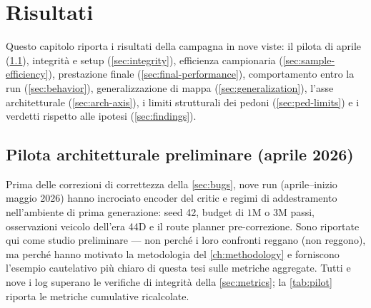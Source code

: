 \chapter{Risultati}
\label{ch:results}

Questo capitolo riporta i risultati della campagna in nove viste: il
pilota di aprile (\cref{sec:pilot}), integrità e setup
(\cref{sec:integrity}), efficienza campionaria
(\cref{sec:sample-efficiency}), prestazione finale
(\cref{sec:final-performance}), comportamento entro la run
(\cref{sec:behavior}), generalizzazione di mappa
(\cref{sec:generalization}), l'asse architetturale
(\cref{sec:arch-axis}), i limiti strutturali dei pedoni
(\cref{sec:ped-limits}) e i verdetti rispetto alle ipotesi
(\cref{sec:findings}).

\section{Pilota architetturale preliminare (aprile 2026)}
\label{sec:pilot}

Prima delle correzioni di correttezza della \cref{sec:bugs}, nove run
(aprile--inizio maggio 2026) hanno incrociato encoder del critic e
regimi di addestramento nell'ambiente di prima generazione: seed 42,
budget di $1$M o $3$M passi, osservazioni veicolo dell'era 44D e il
route planner pre-correzione. Sono riportate qui come studio
preliminare --- non perché i loro confronti reggano (non reggono), ma
perché hanno motivato la metodologia del \cref{ch:methodology} e
forniscono l'esempio cautelativo più chiaro di questa tesi sulle
metriche aggregate. Tutti e nove i log superano le verifiche di
integrità della \cref{sec:metrics}; la \cref{tab:pilot} riporta le
metriche cumulative ricalcolate.

